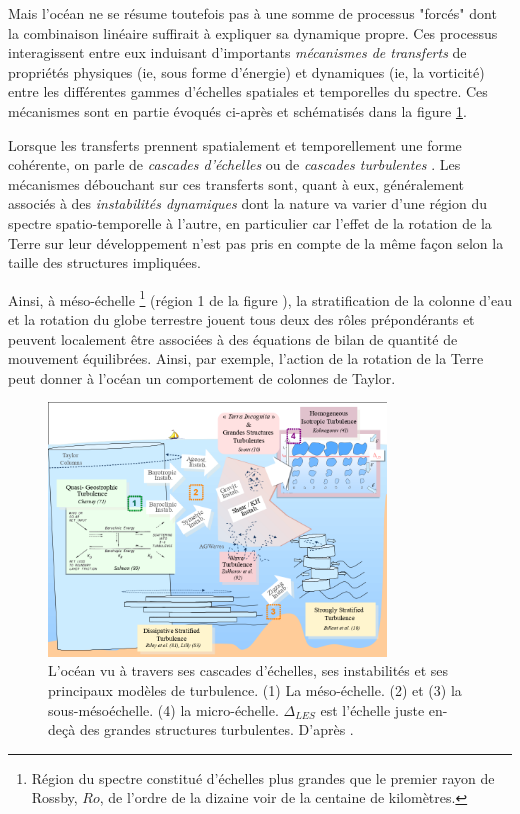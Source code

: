 Mais l'océan ne se résume toutefois pas à une somme de processus "forcés" dont la combinaison linéaire suffirait à expliquer sa dynamique propre. Ces processus interagissent  entre eux induisant d'importants \textit {mécanismes de transferts} de propriétés physiques (ie, sous forme d'énergie) et dynamiques (ie, la vorticité) entre les différentes gammes d'échelles spatiales et temporelles du spectre. Ces mécanismes sont en partie évoqués ci-après et schématisés dans la figure \ref{fig_ocean_scales}. 

Lorsque les transferts prennent spatialement et temporellement une forme cohérente, on parle de \textit{cascades d'échelles} ou de \textit{cascades turbulentes} \citep{lapeyre_topologie_2000}. Les mécanismes débouchant sur ces transferts sont, quant à eux, généralement associés à des \textit{instabilités dynamiques} dont la nature va varier d'une région du spectre spatio-temporelle à l'autre, en particulier car l'effet de la rotation de la Terre sur leur développement n'est pas pris en compte de la même façon selon la taille des structures impliquées.

Ainsi, à méso-échelle \footnote{Région du spectre constitué d'échelles plus grandes que le premier rayon de Rossby, $Ro$, de l'ordre de la dizaine voir de la centaine de kilomètres.} (région 1 de la figure ), la stratification de la colonne d'eau et la rotation du globe terrestre jouent tous deux des rôles prépondérants et peuvent localement être associées à des équations de bilan de quantité de mouvement équilibrées. Ainsi, par exemple, l'action de la rotation de la Terre peut donner à l'océan un comportement de colonnes de Taylor.

\begin{figure}[!h]
  \centering
  \includegraphics[width=0.8\textwidth]{./INTRO/Ocean_Scales.png}
  \caption[L'océan vu à travers ses cascades d'échelles, ses instabilités et ses principaux modèles de turbulence.]{L'océan vu à travers ses cascades d'échelles, ses instabilités et ses principaux modèles de turbulence. (1) La méso-échelle. (2) et (3) la sous-mésoéchelle. (4) la micro-échelle. $\Delta_{LES}$ est l'échelle juste en-deçà des grandes structures turbulentes. D'après \citet{charney_geostrophic_1971, salmon_baroclinic_1980,riley_direct_1981,lilly_stratified_1983,zakharov_wave_1992,billant_zigzag_2010,kolmogorov_local_1941,scotti_large_2010}.}
  \label{fig_ocean_scales}
\end{figure}

